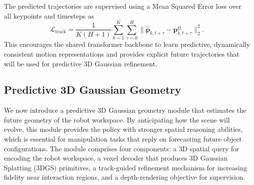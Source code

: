 The predicted trajectories are supervised using a Mean Squared Error loss over all keypoints and timesteps as 
\begin{equation}
\label{eq:track_loss}
\mathcal{L}_{\text{track}}
= \frac{1}{K(H+1)}
\sum_{k=1}^{K}\sum_{\tau=0}^{H}
\|\hat{\mathbf{p}}_{k,t+\tau} - \mathbf{p}^{\text{gt}}_{k,t+\tau}\|_2^2.
\end{equation}
This encourages the shared transformer backbone to learn predictive, dynamically consistent motion representations and provides explicit future trajectories that will be used for predictive 3D Gaussian refinement.


\subsection{Predictive 3D Gaussian Geometry} \label{sec:3dgs}


We now introduce a predictive 3D Gaussian geometry module that estimates the future geometry of the robot workspace. By anticipating how the scene will evolve, this module provides the policy with stronger spatial reasoning abilities, which is essential for manipulation tasks that reply on forecasting future object configurations. The module comprises four components: a 3D spatial query for encoding the robot workspace, a voxel decoder that produces 3D Gaussian Splatting (3DGS) primitives, a track-guided refinement mechanism for increasing fidelity near interaction regions, and a depth-rendering objective for supervision.

